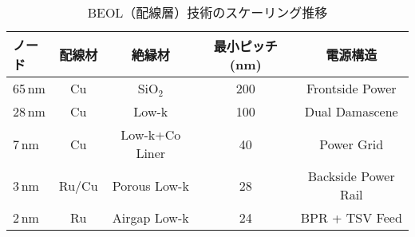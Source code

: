 \begin{table}[t]
  \centering
  \caption{BEOL（配線層）技術のスケーリング推移}
  \label{tab:beol_scaling}
  \begin{tabular}{lcccc}
    \toprule
    ノード & 配線材 & 絶縁材 & 最小ピッチ (nm) & 電源構造 \\
    \midrule
    65\,nm  & Cu & SiO$_2$ & 200 & Frontside Power \\
    28\,nm  & Cu & Low-k & 100 & Dual Damascene \\
    7\,nm   & Cu & Low-k+Co Liner & 40 & Power Grid \\
    3\,nm   & Ru/Cu & Porous Low-k & 28 & Backside Power Rail \\
    2\,nm   & Ru & Airgap Low-k & 24 & BPR + TSV Feed \\
    \bottomrule
  \end{tabular}
\end{table}

